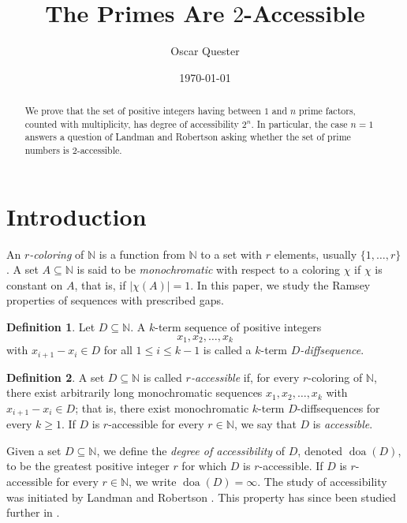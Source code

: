\documentclass{amsart}
\title{The Primes Are $2$-Accessible}
\author{Oscar Quester}
\date{\today}
\theoremstyle{definition}
\newtheorem{definition}{Definition}
\newcommand{\N}{\mathbb{N}}
\begin{document}
\begin{abstract}

We prove that the set of positive integers having between $1$ and $n$ prime factors, counted with multiplicity, has degree of accessibility $2^n$. In particular, the case $n=1$ answers a question of Landman and Robertson asking whether the set of prime numbers is $2$-accessible.

\end{abstract}
\maketitle

\section{Introduction}

An \textit{$r$-coloring} of $\mathbb{N}$ is a function from $\mathbb{N}$ to a set with $r$ elements, usually $\{1,\dots,r\}$. A set $A \subseteq \mathbb{N}$ is said to be \textit{monochromatic} with respect to a coloring $\chi$ if $\chi$ is constant on $A$, that is, if $|\chi(A)|=1$. In this paper, we study the Ramsey properties of sequences with prescribed gaps.

\begin{definition}

Let $D \subseteq \N$. A $k$-term sequence of positive integers $$x_1,x_2,\dots,x_k$$ with $x_{i+1}-x_i \in D$ for all $1 \leq i \leq k-1$ is called a $k$-term \textit{$D$-diffsequence}.

\end{definition}

\begin{definition}
    
A set $D \subseteq \N$ is called \textit{$r$-accessible} if, for every $r$-coloring of $\N$, there exist arbitrarily long monochromatic sequences $x_1,x_2,\dots,x_k$ with $x_{i+1}-x_i \in D$; that is, there exist monochromatic $k$-term $D$-diffsequences for every $k \geq 1$. If $D$ is $r$-accessible for every $r \in \N$, we say that $D$ is \textit{accessible}.
    
\end{definition}

Given a set $D \subseteq \N$, we define the \textit{degree of accessibility} of $D$, denoted $\operatorname{doa}(D)$, to be the greatest positive integer $r$ for which $D$ is $r$-accessible. If $D$ is $r$-accessible for every $r \in \N$, we write $\operatorname{doa}(D)=\infty$. The study of accessibility was initiated by Landman and Robertson \cite{landman2007avoiding}. This property has since been studied further in \cite{ardal2008ramsey,clifton2024new,farhangi2021distance,jungic2005conjecture,landman2014ramsey,landmanramsey,landman2010avoiding,oscar2025,wesley2022improved}.
\end{document}
